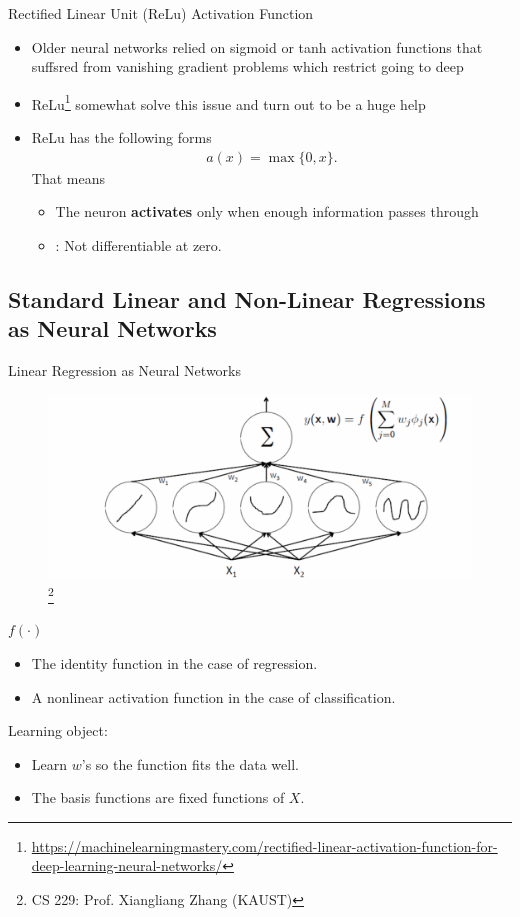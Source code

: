 \documentclass[10pt, hyperref={colorlinks = true,linkcolor = blue}]{beamer}
\begin{document}
{{{\begin{frame}{Rectified Linear Unit (ReLu) Activation Function}
\begin{itemize}
\item Older neural networks relied on sigmoid or tanh activation functions that suffsred from vanishing gradient problems which restrict going to deep
\item ReLu\footnote{\url{https://machinelearningmastery.com/rectified-linear-activation-function-for-deep-learning-neural-networks/}} somewhat solve this issue and turn out to be a huge help
\item ReLu has the following forms
\begin{align*}
a(x) =\max\{0, x\}.
\end{align*}
That means
\begin{itemize}
\item The neuron \textbf{activates} only when enough information passes through
\item {\color{red}{One drawbacks}}: Not differentiable at zero.
\end{itemize}
\end{itemize}
\end{frame}
}
{\subsection{Standard Linear and Non-Linear Regressions as Neural Networks}
\begin{frame}{Linear Regression as Neural Networks}
 \begin{figure}
 \includegraphics[width=0.7\linewidth]{figures/NN-LM.pdf}\footnote{CS 229: Prof. Xiangliang Zhang (KAUST)}
 \end{figure}
 \vspace{-1cm}
 $f(\cdot)$
 \begin{itemize}
\item The identity function in the case of regression.
\item A nonlinear activation function in the case of classification.
\end{itemize}
Learning object: 
\begin{itemize}
\item Learn $w$'s so the function fits the data well.
\item The basis functions are fixed functions of $X$.
 \end{itemize}
\end{frame}



}}}
\end{document}
